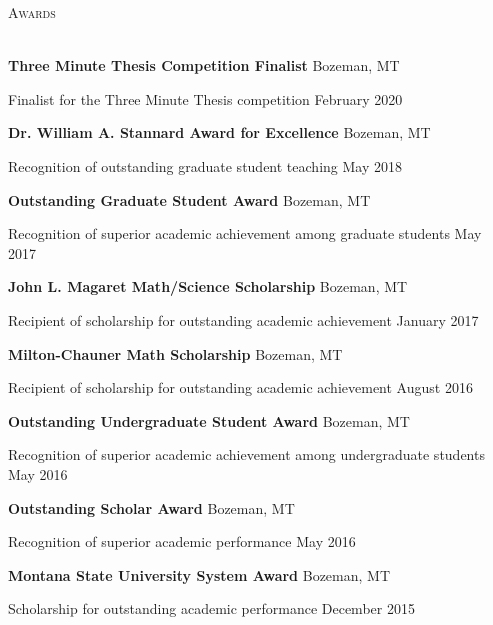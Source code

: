 \documentclass[a4paper]{article}
\newcommand{\lineunder} {
	\vspace*{-8pt} \\
	\hspace*{-18pt} \hrulefill \\
}
\newcommand{\header} [1] {
	{\hspace*{-18pt}\vspace*{6pt} \textcolor{Cerulean}{\textsc{#1}}}
	\vspace*{-6pt} \textcolor{Cerulean}{\lineunder}
}
\begin{document}
\header{Awards}
\vspace*{2mm}

\textbf{Three Minute Thesis Competition Finalist} \hfill Bozeman, MT

Finalist for the Three Minute Thesis competition \hfill February 2020

\vspace*{2mm}

\textbf{Dr. William A. Stannard Award for Excellence} \hfill Bozeman, MT

Recognition of outstanding graduate student teaching \hfill May 2018

\vspace*{2mm}

\textbf{Outstanding Graduate Student Award} \hfill Bozeman, MT

Recognition of superior academic achievement among graduate students
\hfill May 2017

\vspace*{2mm}

\textbf{John L. Magaret Math/Science Scholarship} \hfill Bozeman, MT

Recipient of scholarship for outstanding academic achievement
\hfill January 2017

\vspace*{2mm}

\textbf{Milton-Chauner Math Scholarship} \hfill Bozeman, MT

Recipient of scholarship for outstanding academic achievement
\hfill August 2016

\vspace*{2mm}

\textbf{Outstanding Undergraduate Student Award} \hfill Bozeman, MT

Recognition of superior academic achievement among undergraduate
students \hfill May 2016

\vspace*{2mm}

\textbf{Outstanding Scholar Award} \hfill Bozeman, MT

Recognition of superior academic performance \hfill May 2016

\vspace*{2mm}

\textbf{Montana State University System Award} \hfill Bozeman, MT

Scholarship for outstanding academic performance \hfill December 2015

\vspace*{2mm}
\end{document}
